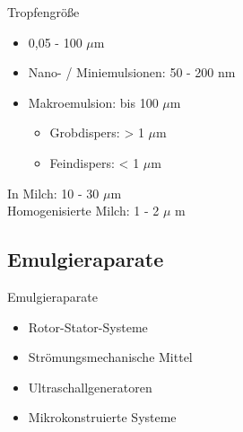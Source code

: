 \documentclass{beamer} %
\begin{document}
\begin{frame}{Tropfengröße}
	\begin{block}{}
		\begin{itemize}
			\item 0,05 - 100 $ \mu $m
			\item Nano- / Miniemulsionen: 50 - 200 nm
			\item Makroemulsion: bis 100 $ \mu $m
			\begin{itemize}
				\item Grobdispers: > 1 $ \mu $m
				\item Feindispers: < 1 $ \mu $m
			\end{itemize}
		\end{itemize}
	\end{block}
	\begin{exampleblock}{}
		In Milch: 10 - 30 $ \mu $m\\
		Homogenisierte Milch: 1 - 2 $ \mu $ m
	\end{exampleblock}
\end{frame}

\subsection{Emulgieraparate}

\begin{frame}{Emulgieraparate}
	\begin{block}{}
		\begin{itemize}
			\item Rotor-Stator-Systeme \pause 
			\item Strömungsmechanische Mittel \pause
			\item Ultraschallgeneratoren \pause
			\item Mikrokonstruierte Systeme
		\end{itemize}
	\end{block}
\end{frame}
\end{document}
